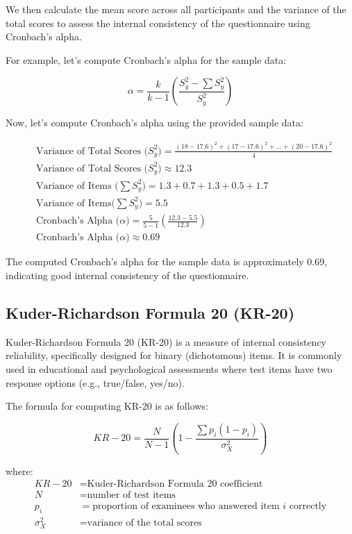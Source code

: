 \documentclass[12pt, a4paper]{exam}
\begin{document}
We then calculate the mean score across all participants and the variance of the total scores to assess the internal consistency of the questionnaire using Cronbach's alpha.

For example, let's compute Cronbach's alpha for the sample data:

\[
\alpha = \frac{k}{k - 1} \left(\frac{S_{y}^{2} - \sum S_{y}^{2}}{S_{y}^{2} }\right)
\]


Now, let's compute Cronbach's alpha using the provided sample data:

\[
\begin{aligned}
&\text{Variance of Total Scores (}S_{y}^{2}\text{)} = \frac{(18-17.6)^2 + (17-17.6)^2 + ...+ (20-17.6)^2}{4} \\
&\text{Variance of Total Scores (}S_{y}^{2}\text{)} \approx 12.3 \\
&\text{Variance of Items (}\sum S_{y}^{2}\text{)} = 1.3 + 0.7 +1.3 + 0.5 + 1.7 \\
&\text{Variance of Items(}\sum S_{y}^{2}\text{)} = 5.5\\
&\text{Cronbach's Alpha (}\alpha\text{)} = \frac{5}{5 - 1} \left(\frac{12.3 - 5.5}{12.3 }\right) \\
&\text{Cronbach's Alpha (}\alpha\text{)}  \approx 0.69
\end{aligned}
\]

The computed Cronbach's alpha for the sample data is approximately 0.69, indicating good internal consistency of the questionnaire.


\subsection {Kuder-Richardson Formula 20 (KR-20)}

Kuder-Richardson Formula 20 (KR-20) is a measure of internal consistency reliability, specifically designed for binary (dichotomous) items. It is commonly used in educational and psychological assessments where test items have two response options (e.g., true/false, yes/no).

The formula for computing KR-20 is as follows:

\[
KR-20 = \frac{{N}}{{N-1}} \left(1 - \frac{{\sum p_i(1 - p_i)}}{{\sigma_X^2}}\right)
\]

where:
\begin{align*}
KR-20 & = \text{Kuder-Richardson Formula 20 coefficient} \\
N & = \text{number of test items} \\
p_i & = \text{proportion of examinees who answered item } i \text{ correctly} \\
\sigma_X^2 & = \text{variance of the total scores}
\end{align*}
\end{document}
